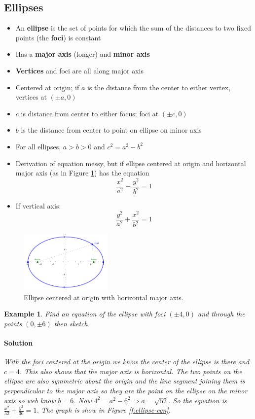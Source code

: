 \documentclass[letterpaper, 11pt, openany]{book}
\theoremstyle{mytheoremstyle}
\theoremstyle{myexamplestyle}
\newtheorem{example}{Example}[section]
\newenvironment{solution}{\paragraph{\sffamily \smaller \fontseries{b}\selectfont Solution}}{\hfill\faSquare}
\begin{document}
\subsection{Ellipses}
\begin{itemize}
    \item An \textbf{ellipse} is the set of points for which the sum of the distances to two fixed points (the \textbf{foci}) is constant
    \item Has a \textbf{major axis} (longer) and \textbf{minor axis}
    \item \textbf{Vertices} and foci are all along major axis
    \item Centered at origin; if $a$ is the distance from the center to either vertex, vertices at $(\pm a, 0)$
    \item $c$ is distance from center to either focus; foci at $(\pm c, 0)$
    \item $b$ is the distance from center to point on ellipse on minor axis
    \item For all ellipses, $a > b > 0$ and $c^{2} = a^{2} - b^{2}$
    \item Derivation of equation messy, but if ellipse centered at origin and horizontal major axis (as in Figure \ref{f:ellipsedef}) has the equation
    \[\frac{x^{2}}{a^{2}} + \frac{y^{2}}{b^{2}} = 1\]
    \item If vertical axis:
    \[\frac{y^{2}}{a^{2}} + \frac{x^{2}}{b^{2}} = 1\]
\end{itemize}

\begin{figure}[htbp]
    \centering
        \includegraphics[width = 0.4\textwidth]{Figures/ellipsedef.pdf}
    \caption{Ellipse centered at origin with horizontal major axis.}
    \label{f:ellipsedef}
\end{figure}

\begin{example}\label{e:ellipse-eqn}
    Find an equation of the ellipse with foci $(\pm 4, 0)$ and through the points $(0, \pm 6)$ then sketch.
    \begin{solution}
        With the foci centered at the origin we know the center of the ellipse is there and $c = 4$. This also shows that the major axis is horizontal. The two points on the ellipse are also symmetric about the origin and the line segment joining them is perpendicular to the major axis so they are the point on the ellipse on the minor axis so web know $b = 6$. Now $4^{2} = a^{2} - 6^{2} \Rightarrow a = \sqrt{52}$. So the equation is $\displaystyle \frac{x^{2}}{52} + \frac{y^{2}}{36} = 1$. The graph is show in Figure \ref{f:ellipse-eqn}.
    \end{solution}
\end{example}
\end{document}
